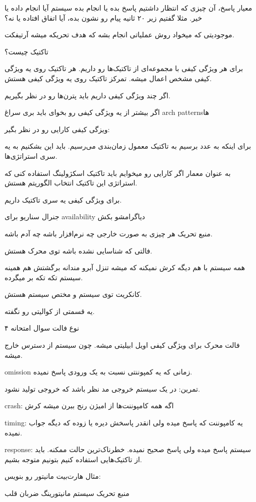 معیار پاسخ، آن چیزی که انتظار داشتیم پاسخ بده یا انجام بده سیستم آیا انجام داده
یا خیر. مثلا گفتیم زیر ۲۰ ثانیه پیام رو نشون بده، آیا اتفاق افتاده یا نه؟

موجودیتی که میخواد روش عملیاتی انجام بشه که هدف تحریکه میشه آرتیفکت.

تاکتیک چیست؟

برای هر ویژگی کیفی با مجموعه‌ای از تاکتیک‌ها رو داریم. هر تاکتیک روی یه ویژگی
کیفی مشخص اعمال میشه. تمرکز تاکتیک روی یه ویژگی کیفی هستش.

اگر چند ویژگی کیفی داریم باید پترن‌ها رو در نظر بگیریم.

اگر بیشتر از یه ویژگی کیفی رو بخوای باید بری سراغ arch patternsها

ویزگی کیفی کارایی رو در نظر بگیر:

برای اینکه به عدد برسیم به تاکتیک معمول زمان‌بندی می‌رسیم. باید این بشکنیم به یه
سری استراتژی‌ها.

به عنوان معمار اگر کارایی رو میخوایم باید تاکتیک اسکژولینگ استفاده کنی که
استراتژی این تاکتیک انتخاب الگوریتم هستش.

برای ویژگی کیفی یه سری تاکتیک داریم.

جنرال سناریو برای availability دیاگرامشو بکش

منبع تحریک هر چیزی به صورت خارجی چه نرم‌افزار باشه چه آدم باشه.

فالتی که شناسایی نشده باشه توی محرک هستش.

همه سیستم با هم دیگه کرش نمیکنه که میشه تنزل آبرو مندانه برگشتش هم همینه سیستم
تکه تکه بر میگرده.

کانکریت توی سیستم و مختص سیستم هستش.

یه قسمتی از کوالیتی رو نگفته.

۴ نوع فالت سوال امتحانه

فالت محرک برای ویژگی کیفی اویل ابیلیتی میشه. چون سیستم از دسترس خارج میشه.

omission زمانی که یه کمپوننتی نسبت به یک ورودی پاسخ نمیده.

تمرین: در یک سیستم خروجی مد نظر باشد که خروجی تولید نشود.

crash: اگه همه کامپوننت‌ها از امیژن رنج ببرن میشه کرش

timing: یه کامپوننت که پاسخ میده ولی انقدر پاسخش دیره یا زوده که دیگه جواب نمیده.

response: سیستم پاسخ میده ولی پاسخ صحیح نمیده. خطرناک‌ترین حالت ممکنه. باید از
تاکتیک‌هایی استفاده کنیم بتونیم متوجه بشیم.

مثال هارت‌بیت مانیتور رو بنویس:

منبع تحریک سیستم مانیتورینگ ضربان قلب

